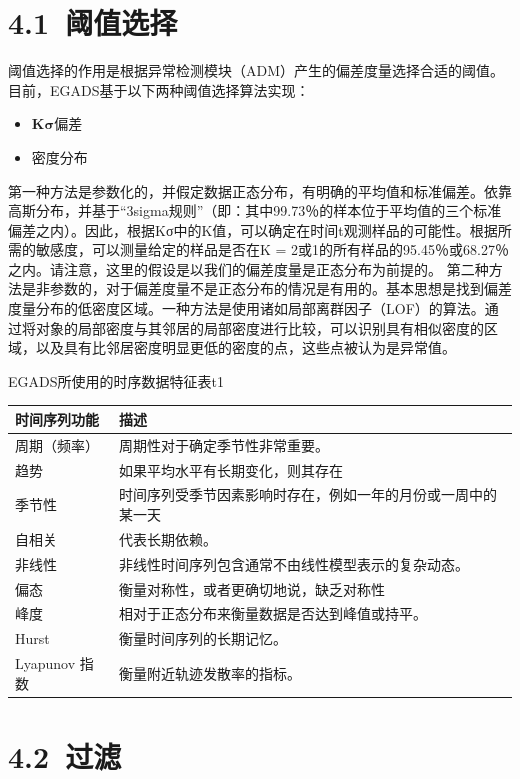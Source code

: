 \documentclass[a4paper,AutoFakeBold,oneside,12pt]{book}
\begin{document}
\section*{4.1\ 阈值选择}
阈值选择的作用是根据异常检测模块（ADM）产生的偏差度量选择合适的阈值。目前，EGADS基于以下两种阈值选择算法实现：
\begin{itemize}
\item $\bm{K\sigma}$偏差
\item 密度分布
\end{itemize}

第一种方法是参数化的，并假定数据正态分布，有明确的平均值和标准偏差。依靠高斯分布，并基于“3sigma规则”（即：其中99.73％的样本位于平均值的三个标准偏差之内）。因此，根据Kσ中的K值，可以确定在时间t观测样品的可能性。根据所需的敏感度，可以测量给定的样品是否在K = 2或1的所有样品的95.45％或68.27％之内。请注意，这里的假设是以我们的偏差度量是正态分布为前提的。 第二种方法是非参数的，对于偏差度量不是正态分布的情况是有用的。基本思想是找到偏差度量分布的低密度区域。一种方法是使用诸如局部离群因子（LOF）的算法。通过将对象的局部密度与其邻居的局部密度进行比较，可以识别具有相似密度的区域，以及具有比邻居密度明显更低的密度的点，这些点被认为是异常值。

\begin{bupttable}{EGADS所使用的时序数据特征表}{t1}
    \begin{tabular}{l|l}
		\hline \textbf{时间序列功能} & \textbf{描述} \\
		\hline 周期（频率） & 周期性对于确定季节性非常重要。 \\
		\hline 趋势 & 如果平均水平有长期变化，则其存在  \\
		\hline 季节性 & 时间序列受季节因素影响时存在，例如一年的月份或一周中的某一天  \\
		\hline 自相关 & 代表长期依赖。\\
		\hline 非线性 & 非线性时间序列包含通常不由线性模型表示的复杂动态。  \\
		\hline 偏态 & 衡量对称性，或者更确切地说，缺乏对称性  \\
		\hline 峰度 & 相对于正态分布来衡量数据是否达到峰值或持平。\\
		\hline Hurst & 衡量时间序列的长期记忆。 \\
		\hline Lyapunov 指数 & 衡量附近轨迹发散率的指标。 \\
		\hline
    \end{tabular}
\end{bupttable}

\section*{4.2\ 过滤}
\end{document}
